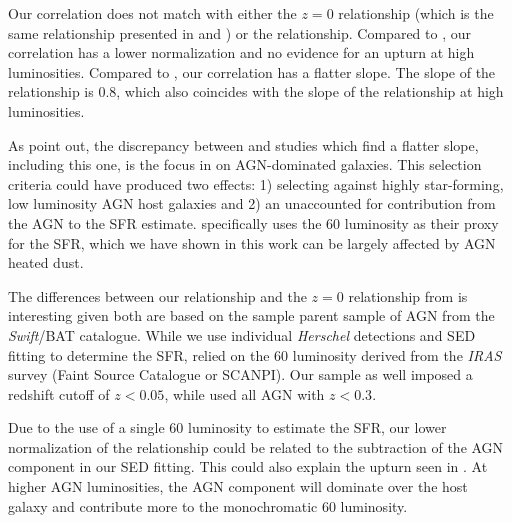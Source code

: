 \documentclass[fleqn, usenatbib]{mnras}
\newcommand{\herschel}{\emph{Herschel}}
\newcommand{\swift}{\textit{Swift}}
\begin{document}
Our correlation does not match with either the \citet{Rosario:2012fr} $z=0$ relationship (which is the same relationship presented in \citet{Lutz:2010kx} and \citet{Shao:2010fp}) or the \citet{Netzer:2009lr} relationship. Compared to \citet{Rosario:2012fr}, our correlation has a lower normalization and no evidence for an upturn at high luminosities. Compared to \citet{Netzer:2009lr}, our correlation has a flatter slope. The slope of the \citet{Netzer:2009lr} relationship is 0.8, which also coincides with the slope of the \citet{Rosario:2012fr} relationship at high luminosities. 

As \citet{Rosario:2012fr} point out, the discrepancy between \citet{Netzer:2009lr} and studies which find a flatter slope, including this one, is the focus in \citet{Netzer:2009lr} on AGN-dominated galaxies. This selection criteria could have produced two effects: 1) selecting against highly star-forming, low luminosity AGN host galaxies and 2) an unaccounted for contribution from the AGN to the SFR estimate. \citet{Netzer:2009lr} specifically uses the 60 \micron{} luminosity as their proxy for the SFR, which we have shown in this work can be largely affected by AGN heated dust. 

The differences between our relationship and the $z=0$ relationship from \citet{Rosario:2012fr} is interesting given both are based on the sample parent sample of AGN from the \swift/BAT catalogue. While we use individual \herschel{} detections and SED fitting to determine the SFR, \citet{Rosario:2012fr} relied on the 60 \micron{} luminosity derived from the \textit{IRAS} survey (Faint Source Catalogue or SCANPI). Our sample as well imposed a redshift cutoff of $z<0.05$, while \citet{Rosario:2012fr} used all AGN with $z < 0.3$. 

Due to the use of a single 60 \micron{} luminosity to estimate the SFR, our lower normalization of the relationship could be related to the subtraction of the AGN component in our SED fitting. This could also explain the upturn seen in \citet{Rosario:2012fr}. At higher AGN luminosities, the AGN component will dominate over the host galaxy and contribute more to the monochromatic 60 \micron{} luminosity.

\end{document}
